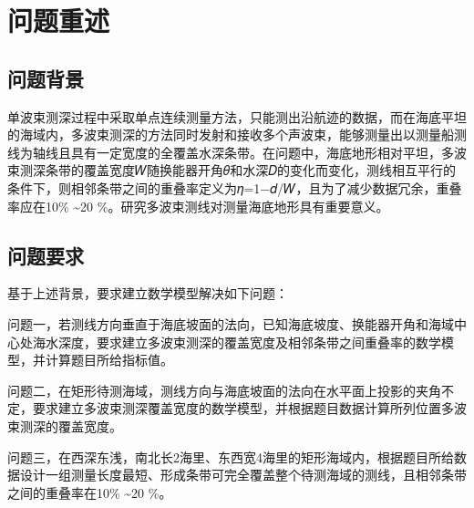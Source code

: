 \documentclass[withoutpreface,bwprint]{cumcmthesis} %
\begin{document}
\begin{abstract}







\end{abstract}



\section{问题重述}
\subsection{问题背景}
单波束测深过程中采取单点连续测量方法，只能测出沿航迹的数据，而在海底平坦的海域内，多波束测深的方法同时发射和接收多个声波束，能够测量出以测量船测线为轴线且具有一定宽度的全覆盖水深条带。在问题中，海底地形相对平坦，多波束测深条带的覆盖宽度𝑊随换能器开角𝜃和水深𝐷的变化而变化，测线相互平行的条件下，则相邻条带之间的重叠率定义为𝜂=1−𝑑/𝑊，且为了减少数据冗余，重叠率应在10\% \textasciitilde 20 \%。研究多波束测线对测量海底地形具有重要意义。
\subsection{问题要求}
基于上述背景，要求建立数学模型解决如下问题：

问题一，若测线方向垂直于海底坡面的法向，已知海底坡度、换能器开角和海域中心处海水深度，要求建立多波束测深的覆盖宽度及相邻条带之间重叠率的数学模型，并计算题目所给指标值。

问题二，在矩形待测海域，测线方向与海底坡面的法向在水平面上投影的夹角不定，要求建立多波束测深覆盖宽度的数学模型，并根据题目数据计算所列位置多波束测深的覆盖宽度。

问题三，在西深东浅，南北长2海里、东西宽4海里的矩形海域内，根据题目所给数据设计一组测量长度最短、形成条带可完全覆盖整个待测海域的测线，且相邻条带之间的重叠率在10\% \textasciitilde 20 \%。
\end{document}
